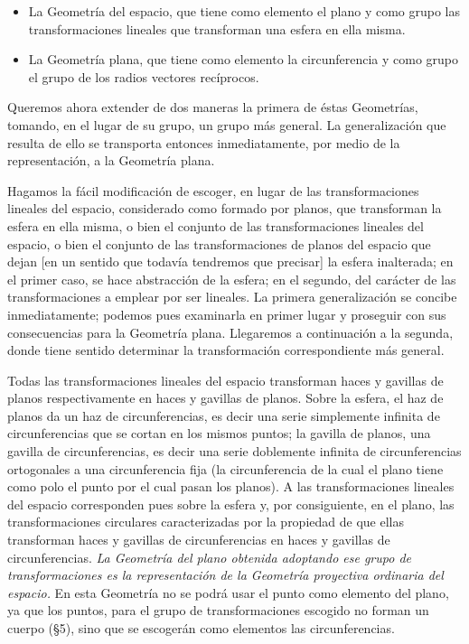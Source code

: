 \documentclass[a4paper, 12pt]{article}
\begin{document}
\begin{itemize}

\item La Geometría del espacio, que tiene como elemento el plano y como grupo las transformaciones lineales que transforman una esfera en ella misma. 

\item La Geometría plana, que tiene como elemento la circunferencia y como grupo el grupo de los radios vectores recíprocos.

\end{itemize}

Queremos ahora extender de dos maneras la primera de éstas Geometrías, tomando, en el lugar de su grupo, un grupo más general. La generalización que resulta de ello se transporta entonces inmediatamente, por medio de la representación, a la Geometría plana.

Hagamos la fácil modificación de escoger, en lugar de las transformaciones lineales del espacio, considerado como formado por planos, que transforman la esfera en ella misma, o bien el conjunto de las transformaciones lineales del espacio, o bien el conjunto de las transformaciones de planos del espacio que dejan [en un sentido que todavía tendremos que precisar] la esfera inalterada; en el primer caso, se hace abstracción de la esfera; en el segundo, del carácter de las transformaciones a emplear por ser lineales. La primera generalización se concibe inmediatamente; podemos pues examinarla en primer lugar y proseguir con sus consecuencias para la Geometría plana. Llegaremos a continuación a la segunda, donde tiene sentido determinar la transformación correspondiente más general.

Todas las transformaciones lineales del espacio transforman haces y gavillas de planos respectivamente en haces y gavillas de planos. Sobre la esfera, el haz de planos da un haz de circunferencias, es decir una serie simplemente infinita de circunferencias que se cortan en los mismos puntos; la gavilla de planos, una gavilla de circunferencias, es decir una serie doblemente infinita de circunferencias ortogonales a una circunferencia fija (la circunferencia de la cual el plano tiene como polo el punto por el cual pasan los planos). A las transformaciones lineales del espacio corresponden pues sobre la esfera y, por consiguiente, en el plano, las transformaciones circulares caracterizadas por la propiedad de que ellas transforman haces y gavillas de circunferencias en haces y gavillas de circunferencias. \textit{La Geometría del plano obtenida adoptando ese grupo de transformaciones es la representación de la Geometría proyectiva ordinaria del espacio.} En esta Geometría no se podrá usar el punto como elemento del plano, ya que los puntos, para el grupo de transformaciones escogido no forman un cuerpo ({\S}5), sino que se escogerán como elementos las circunferencias.
\end{document}
